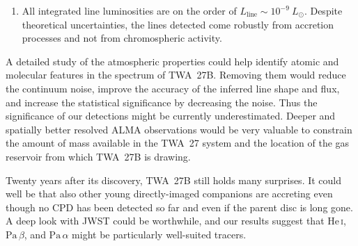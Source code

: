 \documentclass[twocolumn,twocolumnappendix]{aastex631}
\def\LSonne{\ensuremath{L_\odot}\xspace}           %
\def\Paa{\ensuremath{\mathrm{Pa}\,\alpha}\xspace}           %
\def\Pab{\ensuremath{\mathrm{Pa}\,\beta}\xspace}            %
\def\HeI{\ensuremath{\mathrm{He}}\,\textsc{i}\xspace}       %
\def\HeIt{\HeI}                     %
\def\LLinie{\ensuremath{L_{\textrm{line}}}\xspace}                      %
\def\twb{TWA~27B\xspace}
\begin{document}
\begin{enumerate}
  \item
  All integrated line luminosities are on the order of $\LLinie\sim10^{-9}~\LSonne$. Despite theoretical uncertainties, the lines detected come robustly from accretion processes and not from chromospheric activity.
  
\end{enumerate}

A detailed study of the atmospheric properties could help identify atomic and molecular features in the spectrum of \twb. Removing them would reduce the continuum noise, improve the accuracy of the inferred line shape and flux, and increase the statistical significance by decreasing the noise. Thus the significance of our detections might be currently underestimated. Deeper and spatially better resolved ALMA observations would be very valuable to constrain the amount of mass available in the TWA~27 system and the location of the gas reservoir from which \twb is drawing.


Twenty years after its discovery, \twb still holds many surprises.
It could well be that also other young directly-imaged companions are accreting even though no CPD has been detected so far and even if the parent disc is long gone. A deep look with JWST could be worthwhile,
%
%
%
%
%
%
and our results suggest that \HeIt, \Pab, and \Paa might be particularly well-suited tracers.


%
\end{document}
